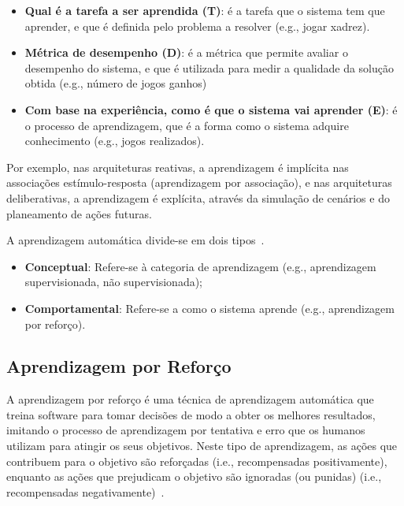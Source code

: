 \begin{itemize}
    \item \textbf{Qual é a tarefa a ser aprendida (T)}: é a tarefa que o sistema tem que aprender, e que é definida pelo problema a resolver (e.g., jogar xadrez).
    \item \textbf{Métrica de desempenho (D)}: é a métrica que permite avaliar o desempenho do sistema, e que é utilizada para medir a qualidade da solução obtida (e.g., número de jogos ganhos)
    \item \textbf{Com base na experiência, como é que o sistema vai aprender (E)}: é o processo de aprendizagem, que é a forma como o sistema adquire conhecimento (e.g., jogos realizados).
\end{itemize}

Por exemplo, nas arquiteturas reativas, a aprendizagem é implícita nas associações estímulo-resposta (aprendizagem por associação), e nas arquiteturas deliberativas, a aprendizagem é explícita, através da simulação de cenários e do planeamento de ações futuras.

A aprendizagem automática divide-se em dois tipos~\cite{isel:iasa:slides:aprendizagem-por-reforco}.

\begin{itemize}
    \item \textbf{Conceptual}: Refere-se à categoria de aprendizagem (e.g., aprendizagem supervisionada, não supervisionada);
    \item \textbf{Comportamental}: Refere-se a como o sistema aprende (e.g., aprendizagem por reforço).
\end{itemize}

\subsection{Aprendizagem por Reforço}\label{subsec:aprendizagem-por-reforco}

A aprendizagem por reforço é uma técnica de aprendizagem automática que treina software para tomar decisões de modo a obter os melhores resultados, imitando o processo de aprendizagem por tentativa e erro que os humanos utilizam para atingir os seus objetivos.
Neste tipo de aprendizagem, as ações que contribuem para o objetivo são reforçadas (i.e., recompensadas positivamente), enquanto as ações que prejudicam o objetivo são ignoradas (ou punidas) (i.e., recompensadas negativamente)~\cite{aprendizagem-por-reforco}.

